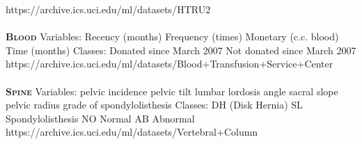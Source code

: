 \documentclass[a4paper,11pt,twoside]{article}
\begin{document}
https://archive.ics.uci.edu/ml/datasets/HTRU2
\\~\\
\textsc{\large \bf Blood}\newline
Variables:\newline
Recency (months)\newline
Frequency (times)\newline
Monetary (c.c. blood)\newline
Time (months)\newline
Classes: Donated since March 2007 Not donated since March 2007\newline
https://archive.ics.uci.edu/ml/datasets/Blood+Transfusion+Service+Center
\\~\\
\textsc{\large \bf Spine}\newline
Variables:\newline
pelvic incidence\newline
pelvic tilt\newline
lumbar lordosis angle\newline
sacral slope\newline
pelvic radius\newline
grade of spondylolisthesis\newline
Classes: \newline
DH (Disk Hernia)\newline
SL Spondylolisthesis \newline
NO Normal\newline 
AB Abnormal \newline
https://archive.ics.uci.edu/ml/datasets/Vertebral+Column
\end{document}
